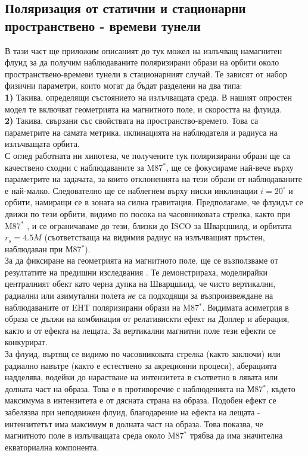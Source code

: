 \subsection{Поляризация от статични и стационарни пространствено - времеви тунели}
В тази част ще приложим описаният до тук можел на излъчващ намагнитен флуид за да получим наблюдаваните поляризирани образи на орбити около пространствено-времеви тунели в стационарният случай. Те зависят от набор физични параметри, които могат да бъдат разделени на два типа:\\

\textbf{1)} Такива, определящи състоянието на излъчващата среда. В нашият опростен модел те включват геометрията на магнитното поле, и скоростта на флуида.\\

\textbf{2)} Такива, свързани със свойствата на пространство-времето. Това са параметрите на самата метрика, иклинацията на наблюдателя и радиуса на излъчващата орбита.\\

С оглед работната ни хипотеза, че получените тук поляризирани образи ще са качествено сходни с наблюдаваните за M87$^*$, ще се фокусираме най-вече върху параметрите на задачата, за които отклоненията на тези образи от наблюдаваните е най-малко. Следователно ще се наблегнем върху ниски инклинации $i = 20^\circ$ и орбити, намиращи се в зоната на силна гравитация. Предполагаме, че флуидът се движи по тези орбити, видимо по посока на часовниковата стрелка, както при M87$^*$ \cite{EHT_M87_V}, и се ограничаваме до тези, близки до ISCO за Шварцшилд, и орбитата $r_s = 4.5M$ (съответстваща на видимия радиус на излъчващият пръстен, наблюдаван при М87$^*$). \\

За да фиксиране на геометрията на магнитното поле, ще се възползваме от резултатите на предишни изследвания \cite{Narayan2021}. Те демонстрираха, моделирайки централният обект като черна дупка на Шварцшилд, че чисто вертикални, радиални или азимутални полета \emph{не} са подходящи за възпроизвеждане на наблюдаваните от EHT поляризирани образи на M87$^*$. Видимата асиметрия в образа се дължи на комбинация от релативискти ефект на Доплер и аберация, както и от ефекта на лещата. За вертикални магнитни поле тези ефекти се конкурират.\\

За флуид, въртящ се видимо по часовниковата стрелка (както \cite{EHT_M87_V} заключи) или радиално навътре (както е естествено за акреционни процеси), аберацията надделява, водейки до нарастване на интензитета в съответно в лявата или долната част на образа. Това е в противоречие с наблюденията на М87$^*$, където максимума в интензитета е от дясната страна на образа. Подобен ефект се забелязва при неподвижен флуид, благодарение на ефекта на лещата - интензитетът има максимум в долната част на образа. Това показва, че магнитното поле в излъчващата среда около M87$^*$ трябва да има значителна екваториална компонента. \\

